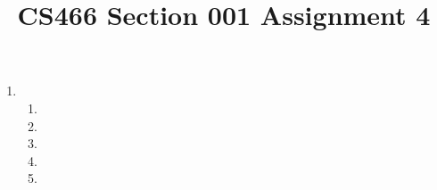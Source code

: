 \documentclass[12pt]{article}
\title{CS466 Section 001 Assignment 4}
\begin{document}
\maketitle

\begin{enumerate}
\item
\begin{enumerate}
\item
\item
\item
\item
\item
\end{enumerate}
\end{enumerate}
\end{document}
